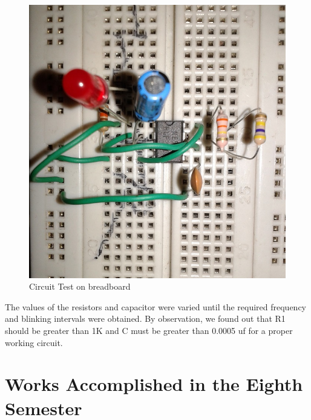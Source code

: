 \documentclass[12pt, a4paper]{article}
\begin{document}
\begin{figure}[htp]
	\centering
	\includegraphics[scale=0.15]{circuit.jpg}
	\caption{Circuit Test on breadboard}
	\label{}
\end{figure}

	The values of the resistors and capacitor were varied until the required frequency and blinking intervals were obtained.
	By observation, we found out that R1 should be greater than 1K and C must be greater than 0.0005 uf for a proper working circuit.


\newpage

\section{Works Accomplished in the Eighth Semester}
	
\end{document}
